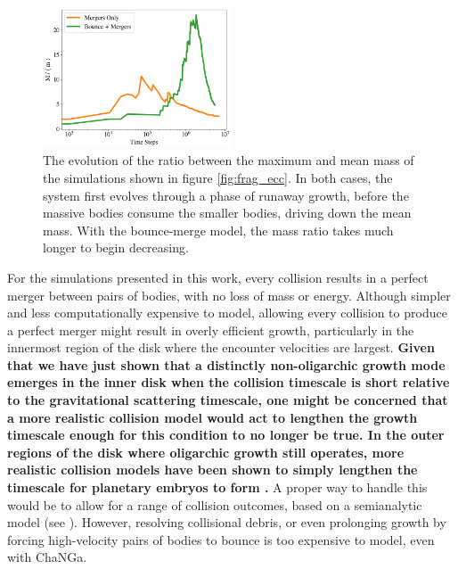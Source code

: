 \documentclass[twocolumn,linenumbers]{aastex63}
\begin{document}
\begin{figure}
\begin{center}
    \includegraphics[width=0.5\textwidth]{figures/frag_evo.png}
    \caption{The evolution of the ratio between the maximum and mean mass of the simulations shown in figure \ref{fig:frag_ecc}. 
    In both cases, the system first evolves through a phase of runaway growth, before the massive bodies consume the smaller 
    bodies, driving down the mean mass. With the bounce-merge model, the mass ratio takes much longer to begin decreasing.\label{fig:frag_evo}}
\end{center}
\end{figure}

For the simulations presented in this work, every collision results in a perfect merger between pairs of bodies, with no loss
of mass or energy. Although simpler and less computationally expensive to model, allowing every collision to produce a
perfect merger might result in overly efficient growth, particularly in the innermost region of the disk where the encounter 
velocities are largest. \textbf{Given that we have just shown that a distinctly non-oligarchic growth mode emerges in the inner disk when the 
collision timescale is short relative to the gravitational scattering timescale, one might be concerned that a more realistic collision model would act 
to lengthen the growth timescale enough for this condition to no longer be true. In the outer regions of the disk where oligarchic growth still 
operates, more realistic collision models have been shown to simply lengthen the timescale for planetary embryos to form 
\citep{wetherill93, leinhardt05}.} A proper way to handle this would be to allow for a range of collision outcomes, based on a semianalytic 
model (see \citet{leinhardt12}). However, resolving collisional debris, or even prolonging growth by forcing high-velocity pairs of 
bodies to bounce is too expensive to model, even with {\sc ChaNGa}.
\end{document}
